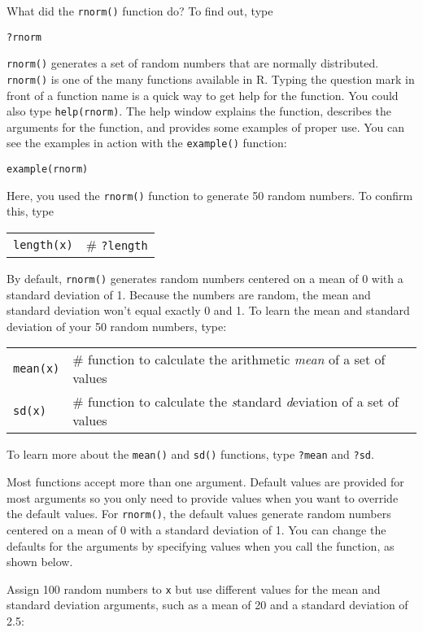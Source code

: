 \documentclass[11pt]{article}
\begin{document}
What did the \texttt{rnorm()} function do? To find out, type

\texttt{?rnorm}

\texttt{rnorm()} generates a set of random numbers that are normally distributed.
\texttt{rnorm()} is one of the many functions available in R. Typing the question
mark in front of a function name is a quick way to get help for the
function. You could also type \texttt{help(rnorm)}. The help window explains the
function, describes the arguments for the function, and provides some
examples of proper use. You can see the examples in action with the
\texttt{example()} function:

\texttt{example(rnorm)}

Here, you used the \texttt{rnorm()} function to generate 50 random numbers. To
confirm this, type

\begin{tabular}{@{}L{1in}L{4.5in}@{}}
\texttt{length(x)} 	&	\# \texttt{?length} \\
\end{tabular}

By default, \texttt{rnorm()} generates random numbers centered on a mean of 0 with
a standard deviation of 1. Because the numbers are random, the mean and
standard deviation won't equal exactly 0 and 1. To learn the mean and
standard deviation of your 50 random numbers, type:

\begin{tabular}{@{}L{1in}L{4.5in}@{}}
\texttt{mean(x)} 	&	 \# function to calculate the arithmetic \emph{mean} of a set of
values \\

\texttt{sd(x)} &	\# function to calculate the \emph{s}tandard \emph{d}eviation of a
set of values\\
\end{tabular}

To learn more about the \texttt{mean()} and \texttt{sd()} functions, type \texttt{?mean} and \texttt{?sd}.

Most functions accept more than one argument. Default values are
provided for most arguments so you only need to provide values when you
want to override the default values. For \texttt{rnorm()}, the default values
generate random numbers centered on a mean of 0 with a standard
deviation of 1. You can change the defaults for the arguments by
specifying values when you call the function, as shown below.

Assign 100 random numbers to \texttt{x} but use different values for the mean and
standard deviation arguments, such as a mean of 20 and a standard
deviation of 2.5:
\end{document}
